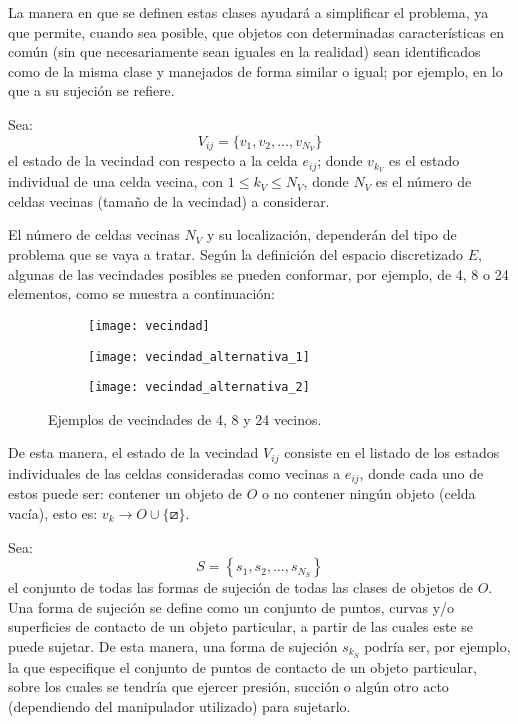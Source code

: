 La manera en que se definen estas clases ayudará a simplificar el problema, ya que permite, cuando sea posible, que objetos con determinadas características en común (sin que necesariamente sean iguales en la realidad) sean identificados como de la misma clase y manejados de forma similar o igual; por ejemplo, en lo que a su sujeción se refiere.

Sea:
%
\begin{equation}
\label{eq:vecindad}
V_{ij} = \{ v_1, v_2, \ldots, v_{N_V} \}
\end{equation}
%
el estado de la vecindad con respecto a la celda $e_{ij}$; donde $v_{k_V}$ es el estado individual de una celda vecina, con $1 \leq k_V \leq N_V$, donde $N_V$ es el número de celdas vecinas (tamaño de la vecindad) a considerar.

El número de celdas vecinas $N_V$ y su localización, dependerán del tipo de problema que se vaya a tratar.
Según la definición del espacio discretizado $E$, algunas de las vecindades posibles se pueden conformar, por ejemplo, de 4, 8 o 24 elementos, como se muestra a continuación:
%
\begin{figure}[H]
	\begin{subfigure}[b]{0.45\textwidth}
		\texttt{[image: vecindad]}%
		\label{subfig:4_vecinos}%
	\end{subfigure}%
	\hspace{1cm}
	\begin{subfigure}[b]{0.45\textwidth}
		\texttt{[image: vecindad\_alternativa\_1]}%
		\label{subfig:8_vecinos}%
	\end{subfigure}%

	\begin{subfigure}[b]{0.45\textwidth}
		\texttt{[image: vecindad\_alternativa\_2]}%
		\label{subfig:24_vecinos}%
	\end{subfigure}%
	\caption{Ejemplos de vecindades de 4, 8 y 24 vecinos.}%
	\label{fig:vecindades}%
\end{figure}
%
De esta manera, el estado de la vecindad $V_{ij}$ consiste en el listado de los estados individuales de las celdas consideradas como vecinas a $e_{ij}$, donde cada uno de estos puede ser: contener un objeto de $O$ o no contener ningún objeto (celda vacía), esto es: $v_k \rightarrow O \cup \{ \boxslash \}$.

Sea:
%
\begin{equation}
\label{eq:sujecion}
S = \left\{s_1, s_2, \ldots, s_{N_S}\right\}
\end{equation}
%
el conjunto de todas las formas de sujeción de todas las clases de objetos de $O$.
Una forma de sujeción se define como un conjunto de puntos, curvas y/o superficies de contacto de un objeto particular, a partir de las cuales este se puede sujetar.
De esta manera, una forma de sujeción $s_{k_S}$ podría ser, por ejemplo, la que especifique el conjunto de puntos de contacto de un objeto particular, sobre los cuales se tendría que ejercer presión, succión o algún otro acto (dependiendo del manipulador utilizado) para sujetarlo.


